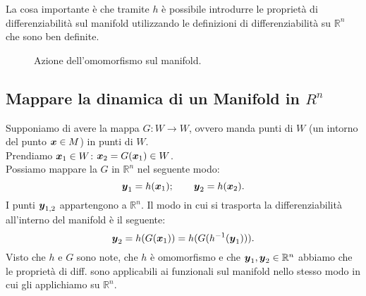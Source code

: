 \noindent
La cosa importante è che tramite $h$ è possibile introdurre le proprietà di differenziabilità sul manifold utilizzando le definizioni di differenziabilità su $\mathbb{R}^n$ che sono ben definite.
\begin{figure}[H]
    \centering
    \caption{\scriptsize Azione dell'omomorfismo sul manifold.}
    \label{fig:3_2}
\end{figure}

\subsection{Mappare la dinamica di un Manifold in $R^n$}%
\label{sub:Mappare la dinamica di un Manifold in Rn }
Supponiamo di avere la mappa $G: W\to W$, ovvero manda punti di $W$ (un intorno del punto $\boldsymbol{x}  \in M$) in punti di $W$.\\
Prendiamo $\boldsymbol{x}_1 \in W$: $\boldsymbol{x}_2 = G(\boldsymbol{x}_1)\in W$.\\
Possiamo mappare la $G$ in $\mathbb{R}^n$ nel seguente modo:
\[
    \boldsymbol{y}_1 = h(\boldsymbol{x}_1); \qquad \boldsymbol{y}_2 = h(\boldsymbol{x}_2)
.\] 
I punti $\boldsymbol{y}_{1,2}$ appartengono a $\mathbb{R}^n$. Il modo in cui si trasporta la differenziabilità all'interno del manifold è il seguente:
\[
    \boldsymbol{y}_2 = h(G(\boldsymbol{x}_1)) = h(G(h^{-1}(\boldsymbol{y}_1)))
.\] 
Visto che $h$ e $G$ sono note, che $h$ è omomorfismo e che $\boldsymbol{y}_1, \boldsymbol{y}_2 \in \mathbb{R}^n$ abbiamo che le proprietà di diff. sono applicabili ai funzionali sul manifold nello stesso modo in cui gli applichiamo su $\mathbb{R}^n$.

